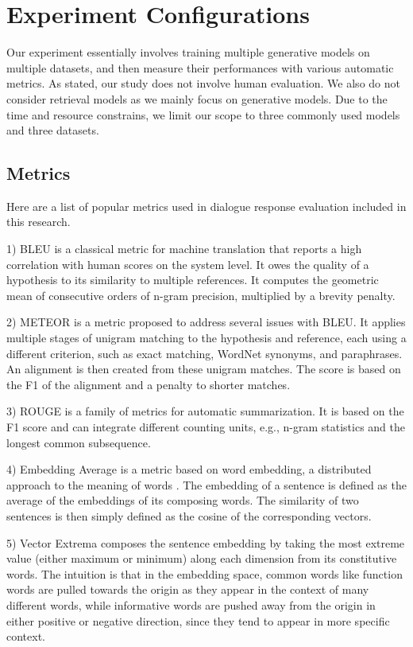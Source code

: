 \documentclass[conference]{IEEEtran}
\begin{document}
\section{Experiment Configurations}
Our experiment essentially involves training multiple generative models on multiple datasets, and then measure their performances with various automatic metrics.
As stated, our study does not involve human evaluation.
We also do not consider retrieval models as we mainly focus on generative models.
Due to the time and resource constrains, we limit our scope to three commonly used models and three datasets.

\subsection{Metrics}
Here are a list of popular metrics used in dialogue response evaluation included in this research.

1) BLEU \cite{BLEU} is a classical metric for machine translation that reports a high correlation with human scores on the system level.
It owes the quality of a hypothesis to its similarity to multiple references.
It computes the geometric mean of consecutive orders of n-gram precision, multiplied by a brevity penalty.

2) METEOR \cite{METEOR} is a metric proposed to address several issues with BLEU.
It applies multiple stages of unigram matching to the hypothesis and reference, each using a different criterion, such as exact matching, WordNet synonyms, and paraphrases.
An alignment is then created from these unigram matches.
The score is based on the F1 of the alignment and a penalty to shorter matches.

3) ROUGE \cite{ROUGE} is a family of metrics for automatic summarization.
It is based on the F1 score and can integrate different counting units, e.g., n-gram statistics and the longest common subsequence.

4) Embedding Average is a metric based on word embedding, a distributed approach to the meaning of words \cite{word2vec}.
The embedding of a sentence is defined as the average of the embeddings of its composing words.
The similarity of two sentences is then simply defined as the cosine of the corresponding vectors.

5) Vector Extrema \cite{Vector_Extrema} composes the sentence embedding by taking the most extreme value (either maximum or minimum) along each dimension from its constitutive words.
The intuition is that in the embedding space, common words like function words are pulled towards the origin as they appear in the context of many different words, while informative words are pushed away from the origin in either positive or negative direction, since they tend to appear in more specific context.
\end{document}
